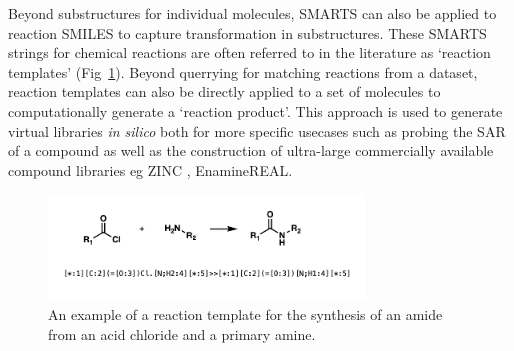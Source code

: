 Beyond substructures for individual molecules, SMARTS can also be applied to reaction SMILES to capture transformation in substructures. These SMARTS strings for chemical reactions are often referred to in the literature as `reaction templates' (Fig~\ref{fig:rx_template}). Beyond querrying for matching reactions from a dataset, reaction templates can also be directly applied to a set of molecules to computationally generate a `reaction product'. This approach is used to generate virtual libraries \cite{Walters2019libraries, SaldivarGonzalez2020enumeration} \textit{in silico} both for more specific usecases such as probing the SAR of a compound as well as the construction of ultra-large commercially available compound libraries eg ZINC \cite{Irwin2020Zinc}, EnamineREAL.


\begin{figure}[htbp!] 
    \centering    
    \includegraphics[width=0.75\textwidth]{Chapters/Background/Figs/rx_template_new.png}
    \caption[Reaction template]{An example of a reaction template for the synthesis of an amide from an acid chloride and a primary amine.}
    \label{fig:rx_template}
\end{figure}

